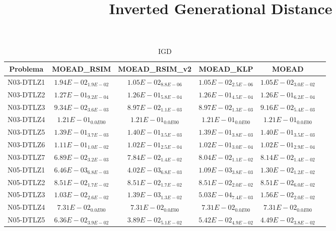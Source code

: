 \documentclass{article}
\title{Inverted Generational Distance}
\author{}
\begin{document}
\maketitle
\begin{table*}[ht!]
\scriptsize
\caption{IGD}
\centering\begin{tabular}{|c||c||c||c||c||c|} \hline
Problema &MOEAD_RSIM &MOEAD_RSIM_v2 &MOEAD_KLP &MOEAD\\\hline
N03-DTLZ1 &$1.94E-02_{1.9E-02}$ &\cellcolor{gray25}$1.05E-02_{8.8E-06}$ &\cellcolor{gray95}$1.05E-02_{2.5E-06}$ &$1.05E-02_{3.0E-02}$\\ 
\hline
N03-DTLZ2 &$1.27E-01_{9.2E-04}$ &\cellcolor{gray25}$1.26E-01_{5.8E-04}$ &\cellcolor{gray95}$1.26E-01_{4.5E-04}$ &$1.26E-01_{6.2E-04}$\\ 
\hline
N03-DTLZ3 &$9.34E-02_{3.6E-03}$ &\cellcolor{gray95}$8.97E-02_{1.1E-03}$ &\cellcolor{gray25}$8.97E-02_{1.3E-03}$ &$9.16E-02_{5.4E-03}$\\ 
\hline
N03-DTLZ4 &\cellcolor{gray95}$1.21E-01_{0.0E00}$ &\cellcolor{gray25}$1.21E-01_{0.0E00}$ &$1.21E-01_{0.0E00}$ &$1.21E-01_{0.0E00}$\\ 
\hline
N03-DTLZ5 &\cellcolor{gray25}$1.39E-01_{3.7E-03}$ &$1.40E-01_{3.5E-03}$ &\cellcolor{gray95}$1.39E-01_{3.8E-03}$ &$1.40E-01_{3.5E-03}$\\ 
\hline
N03-DTLZ6 &$1.11E-01_{1.0E-02}$ &\cellcolor{gray25}$1.02E-01_{2.5E-04}$ &$1.02E-01_{3.0E-04}$ &\cellcolor{gray95}$1.02E-01_{2.9E-04}$\\ 
\hline
N03-DTLZ7 &\cellcolor{gray95}$6.89E-02_{3.2E-03}$ &\cellcolor{gray25}$7.84E-02_{1.4E-02}$ &$8.04E-02_{1.1E-02}$ &$8.14E-02_{1.4E-02}$\\ 
\hline
N05-DTLZ1 &$6.46E-03_{6.8E-03}$ &\cellcolor{gray25}$4.02E-03_{6.8E-03}$ &\cellcolor{gray95}$1.09E-03_{3.8E-03}$ &$1.30E-02_{1.2E-02}$\\ 
\hline
N05-DTLZ2 &\cellcolor{gray95}$8.51E-02_{1.7E-02}$ &\cellcolor{gray25}$8.51E-02_{1.7E-02}$ &$8.51E-02_{2.0E-02}$ &$8.51E-02_{6.0E-02}$\\ 
\hline
N05-DTLZ3 &$1.03E-02_{2.6E-02}$ &\cellcolor{gray25}$1.39E-03_{1.3E-02}$ &\cellcolor{gray95}$5.03E-04_{7.4E-03}$ &$1.56E-02_{2.0E-02}$\\ 
\hline
N05-DTLZ4 &\cellcolor{gray95}$7.31E-02_{0.0E00}$ &\cellcolor{gray25}$7.31E-02_{0.0E00}$ &$7.31E-02_{0.0E00}$ &$7.31E-02_{0.0E00}$\\ 
\hline
N05-DTLZ5 &$6.36E-02_{3.9E-02}$ &\cellcolor{gray95}$3.89E-02_{5.1E-02}$ &$5.42E-02_{4.9E-02}$ &\cellcolor{gray25}$4.49E-02_{3.8E-02}$\\ 

\end{tabular}
\end{table*}
\end{document}
